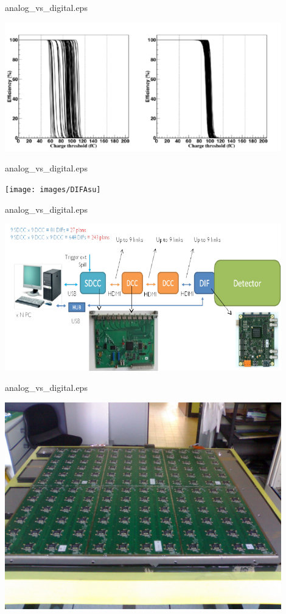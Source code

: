 \documentclass[10pt]{beamer}
\begin{document}
\begin{frame}{analog\_vs\_digital.eps}
    \centerline{\includegraphics[width=0.9\textwidth]{images/HR2GainAdjustement}}
\end{frame}
\begin{frame}{analog\_vs\_digital.eps}
    \centerline{\texttt{[image: images/DIFAsu]}}
\end{frame}
\begin{frame}{analog\_vs\_digital.eps}
    \centerline{\includegraphics[width=0.9\textwidth]{images/DAQLinks}}
\end{frame}
\begin{frame}{analog\_vs\_digital.eps}
    \centerline{\includegraphics[width=0.9\textwidth]{images/1m2HR2}}
\end{frame}
\end{document}
